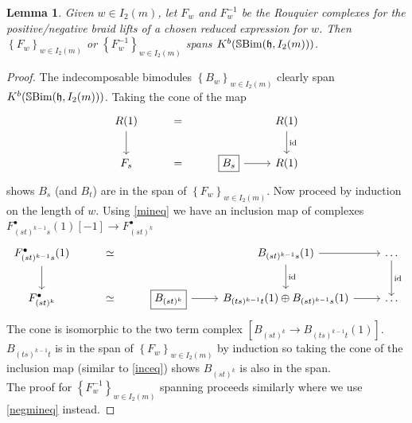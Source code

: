 \documentclass[10pt]{article}
\numberwithin{theorem}{section}
\newtheorem{lemma}[theorem]{Lemma}
\theoremstyle{definition}
\newcommand{\hf}{\mathfrak{h}}
\newcommand{\id}{\mathrm{id}}
\newcommand{\sbim}{\mathbb{S}\textnormal{Bim}}
\newcommand{\sbrac}[1]{\left[#1 \right]}
\newcommand{\set}[1]{\left \{ #1 \right \}}
\newcommand{\0}{\ \raisebox{-2ex}{\begin{tikzpicture}[xscale=0.25,yscale=0.3,thick,baseline]
 \draw (0,0) -- (0,3); 
\end{tikzpicture}}}
\renewcommand{\1}{\ \raisebox{-2ex}{\begin{tikzpicture}[xscale=0.25,yscale=0.3,thick,baseline]
 \draw (0,0) -- (0,1);
 \draw (0,2) -- (0,3);
 \node[dot] at (0,1) {};
  \node[dot] at (0,2) {};
\end{tikzpicture}}}
\begin{document}
\begin{lemma}
Given $w\in I_2(m)$, let $F_w$ and $F_w^{-1}$ be the Rouquier complexes for the positive/negative braid lifts of a chosen reduced expression for $w$. Then $\set{F_w}_{w\in I_2(m)}$ or $\set{ F_w^{-1}}_{w\in I_2(m)}$ spans $K^b(\sbim(\hf, I_2(m)))$.
\end{lemma}
\begin{proof}
The indecomposable bimodules $\set{B_w}_{w\in I_2(m)}$ clearly span $K^b(\sbim(\hf, I_2(m)))$. Taking the cone of the map
\begin{equation}
\label{inceq}
\begin{tikzcd}
 R(1) \arrow[d, ]&= & & R(1) \arrow[d, "\id"] \\
 F_s &= &\boxed{B_s} \arrow[r] & R(1)
\end{tikzcd}
\end{equation}
shows $B_s$ (and $B_t$) are in the span of $\set{F_w}_{w\in I_2(m)}$. Now proceed by induction on the length of $w$. Using \cref{mineq} we have an inclusion map of complexes $F^\bullet_{(st)^{k-1}s}(1)[-1]\to F^\bullet_{(st)^{k}} $
\[\begin{tikzcd}
 F^\bullet_{(st)^{k-1}s}(1) \arrow[d, ]&\simeq & & B_{(st)^{k-1}s}(1) \arrow[d, "\id"] \ar[r]& \ldots \ar[d, "\id"] \\
F^\bullet_{(st)^{k}} &\simeq &\boxed{B_{(st)^{k}}} \arrow[r] & B_{(ts)^{k-1}t}(1)\oplus B_{(st)^{k-1}s}(1) \ar[r]& \ldots 
\end{tikzcd}\]
The cone is isomorphic to the two term complex $\sbrac{\boxed{B_{(st)^{k}}} \to B_{(ts)^{k-1}t}(1)}$. $B_{(ts)^{k-1}t}$ is in the span of $\set{F_w}_{w\in I_2(m)}$ by induction so taking the cone of the inclusion map (similar to \cref{inceq}) shows $B_{(st)^{k}}$ is also in the span.\\

The proof for $\set{ F_w^{-1}}_{w\in I_2(m)}$ spanning proceeds similarly where we use \cref{negmineq} instead.
\end{proof}
\end{document}
